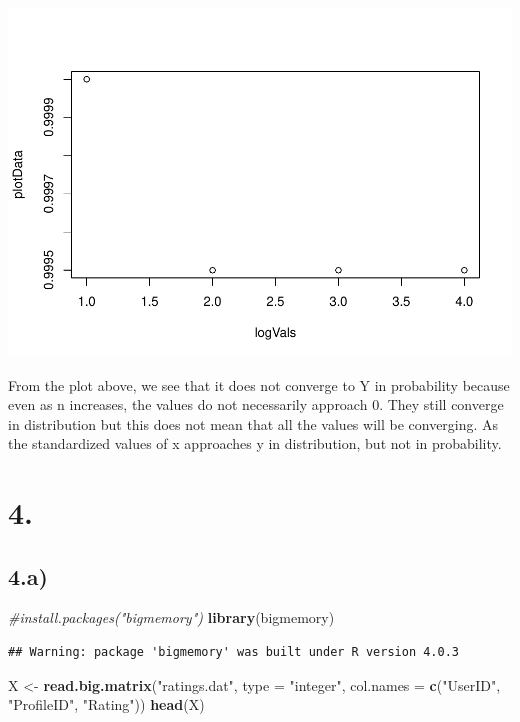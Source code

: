 \documentclass[
]{article}
\newenvironment{Shaded}{\begin{snugshade}}{\end{snugshade}}
\newcommand{\CommentTok}[1]{\textcolor[rgb]{0.56,0.35,0.01}{\textit{#1}}}
\newcommand{\DataTypeTok}[1]{\textcolor[rgb]{0.13,0.29,0.53}{#1}}
\newcommand{\KeywordTok}[1]{\textcolor[rgb]{0.13,0.29,0.53}{\textbf{#1}}}
\newcommand{\NormalTok}[1]{#1}
\newcommand{\StringTok}[1]{\textcolor[rgb]{0.31,0.60,0.02}{#1}}
\begin{document}
\includegraphics{stad80a1_files/figure-latex/unnamed-chunk-15-1.pdf}

From the plot above, we see that it does not converge to Y in
probability because even as n increases, the values do not necessarily
approach 0. They still converge in distribution but this does not mean
that all the values will be converging. As the standardized values of x
approaches y in distribution, but not in probability.

\hypertarget{section-4}{%
\section{4.}\label{section-4}}

\hypertarget{a-2}{%
\subsection{4.a)}\label{a-2}}

\begin{Shaded}
\begin{Highlighting}[]
\CommentTok{#install.packages("bigmemory")}
\KeywordTok{library}\NormalTok{(bigmemory)}
\end{Highlighting}
\end{Shaded}

\begin{verbatim}
## Warning: package 'bigmemory' was built under R version 4.0.3
\end{verbatim}

\begin{Shaded}
\begin{Highlighting}[]
\NormalTok{X <-}\StringTok{ }\KeywordTok{read.big.matrix}\NormalTok{(}\StringTok{"ratings.dat"}\NormalTok{, }\DataTypeTok{type =} \StringTok{"integer"}\NormalTok{, }\DataTypeTok{col.names =} \KeywordTok{c}\NormalTok{(}\StringTok{"UserID"}\NormalTok{, }\StringTok{"ProfileID"}\NormalTok{, }\StringTok{"Rating"}\NormalTok{))}
\KeywordTok{head}\NormalTok{(X)}
\end{Highlighting}
\end{Shaded}
\end{document}

